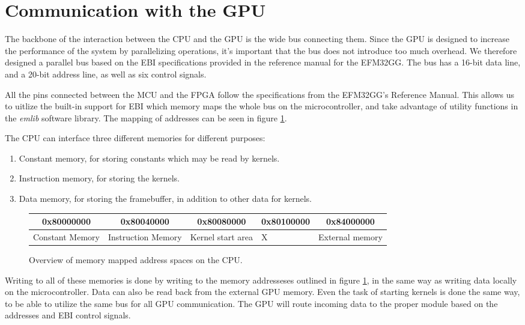 \documentclass[../main/report.tex]{subfiles}
\begin{document}
\section{Communication with the GPU}

The backbone of the interaction between the CPU and the GPU is the wide bus connecting them.
Since the GPU is designed to increase the performance of the system by parallelizing operations,
it's important that the bus does not introduce too much overhead.
We therefore designed a parallel bus based on the EBI specifications provided
in the reference manual for the EFM32GG\cite[p.175]{efm32gg}.
The bus has a 16-bit data line, and a 20-bit address line, as well as six control signals.

All the pins connected between the MCU and the FPGA follow the specifications from the EFM32GG's Reference Manual\cite[p.175]{efm32gg}.
This allows us to uitlize the built-in support for EBI which memory maps the whole bus on the microcontroller, and take advantage of utility functions in the \emph{emlib} software library\cite{emlib}.
The mapping of addresses can be seen in figure \ref{fig:memory_map}.

The CPU can interface three different memories for different purposes:

\begin{enumerate}
    \item Constant memory, for storing constants which may be read by kernels.
    \item Instruction memory, for storing the kernels.
    \item Data memory, for storing the framebuffer, in addition to other data for kernels.
\end{enumerate}

\begin{figure}[H]
    \centering
    \begin{tabularx}{\textwidth}{|X|X|X|X|X|}
    \multicolumn{1}{c}{0x80000000} & \multicolumn{1}{c}{0x80040000} & \multicolumn{1}{c}{0x80080000} & \multicolumn{1}{c}{0x80100000} & \multicolumn{1}{c}{0x84000000} \\ \hline
    Constant Memory & Instruction Memory & Kernel start area & X & External memory \\ \hline
    \end{tabularx}
    \caption{Overview of memory mapped address spaces on the CPU.}
    \label{fig:memory_map}
\end{figure}

Writing to all of these memories is done by writing to the memory addresseses
outlined in figure \ref{fig:memory_map},
in the same way as writing data locally on the microcontroller.
Data can also be read back from the external GPU memory.
Even the task of starting kernels is done the same way, to be able to utilize the same bus for all GPU communication.
The GPU will route incoming data to the proper module based on the addresses and EBI control signals.
\end{document}
